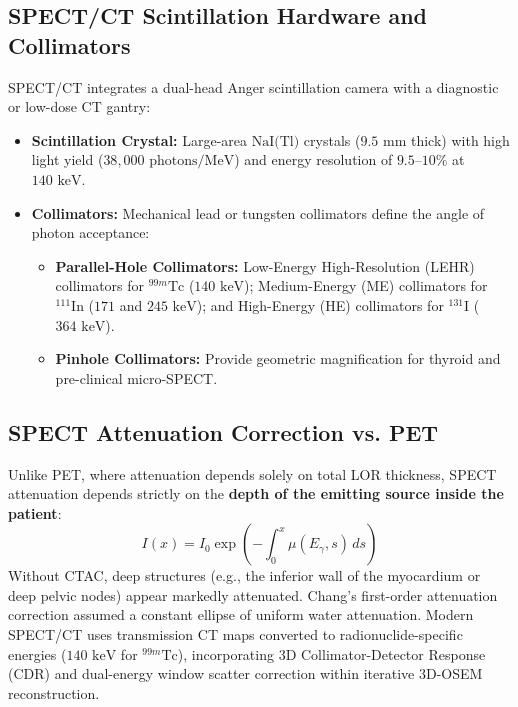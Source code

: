 \documentclass[11pt,a4paper]{article}
\begin{document}
\subsection{SPECT/CT Scintillation Hardware and Collimators}
SPECT/CT integrates a dual-head Anger scintillation camera with a diagnostic or low-dose CT gantry:
\begin{itemize}[leftmargin=2em]
    \item \textbf{Scintillation Crystal:} Large-area $\text{NaI(Tl)}$ crystals ($9.5\text{ mm}$ thick) with high light yield ($38,000\text{ photons/MeV}$) and energy resolution of $9.5\text{--}10\%$ at $140\text{ keV}$.
    \item \textbf{Collimators:} Mechanical lead or tungsten collimators define the angle of photon acceptance:
    \begin{itemize}
        \item \textbf{Parallel-Hole Collimators:} Low-Energy High-Resolution (LEHR) collimators for $^{99m}\text{Tc}$ ($140\text{ keV}$); Medium-Energy (ME) collimators for $^{111}\text{In}$ ($171$ and $245\text{ keV}$); and High-Energy (HE) collimators for $^{131}\text{I}$ ($364\text{ keV}$).
        \item \textbf{Pinhole Collimators:} Provide geometric magnification for thyroid and pre-clinical micro-SPECT.
    \end{itemize}
\end{itemize}

\subsection{SPECT Attenuation Correction vs. PET}
Unlike PET, where attenuation depends solely on total LOR thickness, SPECT attenuation depends strictly on the \textbf{depth of the emitting source inside the patient}:
\begin{equation}
    I(x) = I_0 \exp\left( -\int_0^x \mu(E_{\gamma}, s) \, ds \right)
\end{equation}
Without CTAC, deep structures (e.g., the inferior wall of the myocardium or deep pelvic nodes) appear markedly attenuated. Chang's first-order attenuation correction assumed a constant ellipse of uniform water attenuation. Modern SPECT/CT uses transmission CT maps converted to radionuclide-specific energies ($140\text{ keV}$ for $^{99m}\text{Tc}$), incorporating 3D Collimator-Detector Response (CDR) and dual-energy window scatter correction within iterative 3D-OSEM reconstruction.
\end{document}
